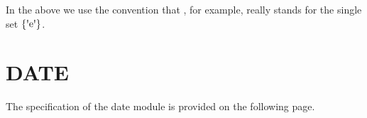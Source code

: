 \documentclass[runningheads,12pt]{article}
\begin{document}
In the above we use the convention that , for example, really stands for the single set $\{\squote{e}\}$.





\section{DATE}
The specification of the date module is provided on the following page.
\newpage

\centering 
    
%
\end{document}
